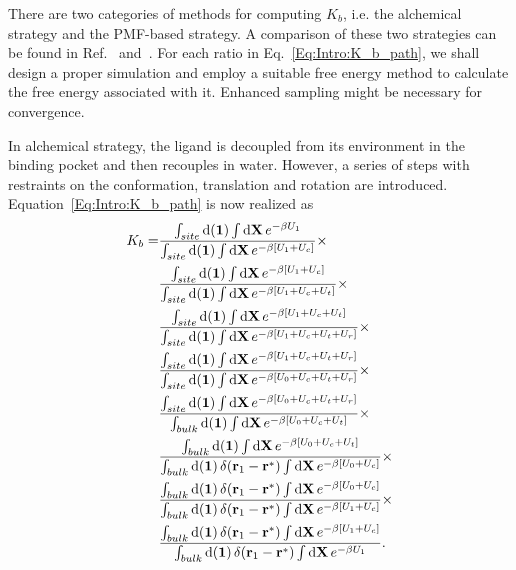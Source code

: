 There are two categories of methods for computing $K_b$, i.e. the alchemical strategy\cite{DengJCTC2006} and the PMF-based strategy\cite{WooPNAS2005}. A comparison of these two strategies can be found in Ref.~\cite{DengJPCB2009} and~\cite{GumbartJCTC2013}. For each ratio in Eq.~\ref{Eq:Intro:K_b_path}, we shall design a proper simulation and employ a suitable free energy method to calculate the free energy associated with it. Enhanced sampling might be necessary for convergence.

In alchemical strategy, the ligand is decoupled from its environment in the binding pocket and then recouples in water. However, a series of steps with restraints on the conformation, translation and rotation are introduced. Equation~\ref{Eq:Intro:K_b_path} is now realized as
\begin{align}
  K_b=&\frac{\int_{site}\diff(\mathbf{1})\int \diff\mathbf{X}\,e^{-\beta U_1}}{\int_{site}\diff(\mathbf{1})\int \diff\mathbf{X}\,e^{-\beta [U_1+U_c]}}\times\notag\\
      &\frac{\int_{site}\diff(\mathbf{1})\int \diff\mathbf{X}\,e^{-\beta [U_1+U_c]}}{\int_{site}\diff(\mathbf{1})\int \diff\mathbf{X}\,e^{-\beta [U_1+U_c+U_t]}}\times\notag\\
      &\frac{\int_{site}\diff(\mathbf{1})\int \diff\mathbf{X}\,e^{-\beta [U_1+U_c+U_t]}}{\int_{site}\diff(\mathbf{1})\int \diff\mathbf{X}\,e^{-\beta [U_1+U_c+U_t+U_r]}}\times\notag\\
      &\frac{\int_{site}\diff(\mathbf{1})\int \diff\mathbf{X}\,e^{-\beta [U_1+U_c+U_t+U_r]}}{\int_{site}\diff(\mathbf{1})\int \diff\mathbf{X}\,e^{-\beta [U_0+U_c+U_t+U_r]}}\times\notag\\
      &\frac{\int_{site}\diff(\mathbf{1})\int \diff\mathbf{X}\,e^{-\beta [U_0+U_c+U_t+U_r]}}{\int_{bulk}\diff(\mathbf{1})\int \diff\mathbf{X}\,e^{-\beta [U_0+U_c+U_t]}}\times\notag\\
      &\frac{\int_{bulk}\diff(\mathbf{1})\int \diff\mathbf{X}\,e^{-\beta [U_0+U_c+U_t]}}{\int_{bulk}\diff(\mathbf{1})\,\delta(\mathbf{r}_1-\mathbf{r}^*)\int \diff\mathbf{X}\,e^{-\beta [U_0+U_c]}}\times\notag\\
      &\frac{\int_{bulk}\diff(\mathbf{1})\,\delta(\mathbf{r}_1-\mathbf{r}^*)\int \diff\mathbf{X}\,e^{-\beta [U_0+U_c]}}{\int_{bulk}\diff(\mathbf{1})\,\delta(\mathbf{r}_1-\mathbf{r}^*)\int \diff\mathbf{X}\,e^{-\beta [U_1+U_c]}}\times\notag\\
      &\frac{\int_{bulk}\diff(\mathbf{1})\,\delta(\mathbf{r}_1-\mathbf{r}^*)\int \diff\mathbf{X}\,e^{-\beta [U_1+U_c]}}{\int_{bulk}\diff(\mathbf{1})\,\delta(\mathbf{r}_1-\mathbf{r}^*)\int \diff\mathbf{X}\,e^{-\beta U_1}}.
\end{align}

